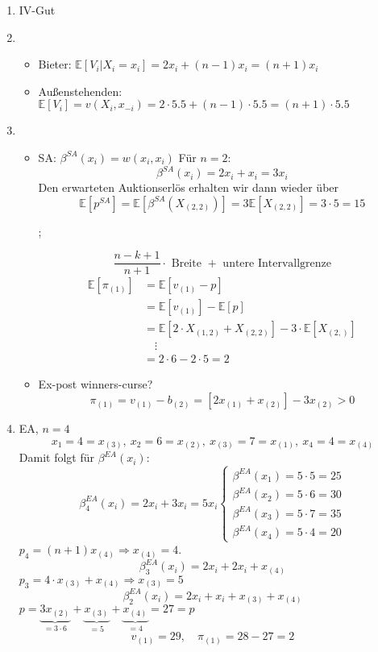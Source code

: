 \documentclass[12pt]{extreport} %
\theoremstyle{named}
\theoremstyle{itshape}
\theoremstyle{normal}
\begin{document}
\begin{enumerate}
	\item IV-Gut
	\item ~\\
	 \begin{itemize}
		\item Bieter: $\mathds{E}[V_{i} \big| X_{i} = x_{i}] = 2 x_{i} + (n-1) x_{i} = (n+1) x_{i}$
		\item Außenstehenden: $\mathds{E}[V_{i}] = v(X_{i}, x_{-i}) = 2 \cdot 5.5 + (n-1) \cdot 5.5 = (n+1) \cdot 5.5$
	\end{itemize}
	\item ~\\
		\begin{itemize}
			\item SA: $\beta^{SA}(x_{i}) = w(x_{i}, x_{i})$ Für $n = 2$:
				$$ \beta^{SA}(x_{i}) = 2x_{i} + x_{i} = 3x_{i} $$
			Den erwarteten Auktionserlös erhalten wir dann wieder über
				$$ \mathds{E}\left[ p^{SA} \right] = \mathds{E}\left[ \beta^{SA}(X_{(2,2)}) \right] = 3 \mathds{E}\left[ X_{(2,2)} \right] = 3 \cdot 5 = 15  $$
			\begin{figure*}
				;
			\end{figure*}
    				$$ \frac{n-k + 1}{n + 1} \cdot \text{ Breite } + \text{ untere Intervallgrenze} $$	
    		\begin{align*}
    			\mathds{E}[\pi_{(1)}] & = \mathds{E}[v_{(1)} - p]  \\
    			& = \mathds{E}[v_{(1)}]  - \mathds{E}[p]  \\
    			& = \mathds{E}[2 \cdot X_{(1,2)} + X_{(2,2)}]  - 3 \cdot \mathds{E}[ X_{(2,)} ]  \\
    			& \quad \vdots \\
    			& = 2 \cdot 6 - 2 \cdot 5 = 2
    		\end{align*}
			\item Ex-post winners-curse?
				$$ \pi_{(1)} = v_{(1)} - b_{(2)} = \left[ 2 x_{(1)} + x_{(2)} \right] - 3 x_{(2)} > 0 $$
		\end{itemize}
	\item EA, $n=4$
		$$ x_1 = 4 = x_{(3)}, ~x_2 = 6 = x_{(2)}, ~x_{(3)} = 7 = x_{(1)}, ~x_{4} = 4 = x_{(4)} $$
		Damit folgt für $\beta^{EA}(x_{i})$:
		$$ \beta_{4}^{EA}(x_{i}) = 2x_{i} + 3 x_{i} = 5 x_{i} \begin{cases}
			\beta^{EA}(x_{1}) = 5 \cdot 5 = 25 \\ \beta^{EA}(x_{2}) = 5 \cdot 6 = 30 \\ \beta^{EA}(x_{3}) = 5 \cdot 7 = 35 \\ \beta^{EA}(x_{4}) = 5 \cdot 4 = 20  
		\end{cases} $$
		$p_4 = (n+1) x_{(4)} \Rightarrow x_{(4)} = 4$.
			$$ \beta_{3}^{EA}(x_{i}) = 2 x_{i} + 2x_{i} + x_{(4)} $$
		$p_3 = 4 \cdot x_{(3)} + x_{(4)} \Rightarrow x_{(3)} = 5$
			$$ \beta_{2}^{EA}(x_{i}) = 2 x_{i} + x_{i} + x_{(3)} + x_{(4)} $$
		$p = \underbrace{3 x_{(2)}}_{= 3 \cdot 6} +  \underbrace{x_{(3)}}_{= 5} +  \underbrace{x_{(4)}}_{= 4} = 27 = p$
		$$ v_{(1)} = 29, \quad  \pi_{(1)} = 28 - 27 = 2 $$
\end{enumerate}

\printindex
\end{document}
